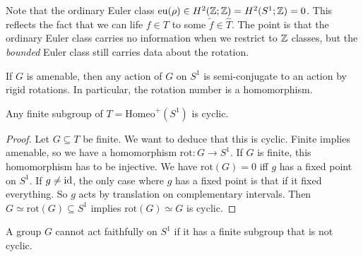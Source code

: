 Note that the ordinary Euler class $\mathrm{eu}(\rho) \in  H^2(\mathbb{Z} ;\mathbb{Z})= H^2(S^1 ;\mathbb{Z})=0$. This reflects the fact that we can life $f \in T$ to some $\widetilde f \in  \hat{T}$. The point is that the ordinary Euler class carries no information when we restrict to $\mathbb{Z}$ classes, but the \emph{bounded} Euler class still carries data about the rotation.
\begin{theorem}
   If $G$ is amenable, then any action of $G$ on $S^1 $ is semi-conjugate to an action by rigid rotations.  In particular, the rotation number is a homomorphism.
\end{theorem}
\begin{prop}
    Any finite subgroup of $T= \mathrm{Homeo}^+(S^1 )$ is cyclic.
\end{prop}
\begin{proof}
    Let $G \subseteq T$ be finite. We want to deduce that this is cyclic. Finite implies amenable, so we have a homomorphism $ \mathrm{rot }\colon G \to S^1 $. If $G$ is finite, this homomorphism has to be injective. We have $\mathrm{rot}(G)=0 $ iff $g$ has a fixed point on $S^1 $. If $g\neq \operatorname{id}$, the only case where $g$ has a fixed point is that if it fixed everything. So $g$ acts by translation on complementary intervals. Then $G \simeq  \mathrm{rot}(G) \subseteq S^1 $ implies $\mathrm{rot}(G) \simeq  G$ is cyclic.
\end{proof}
\begin{cor}
    A group $G$ cannot act faithfully on $S^1 $ if it has a finite subgroup that is not cyclic.
\end{cor}
